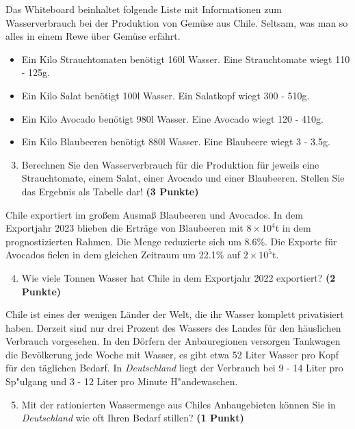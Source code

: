 \documentclass[a4paper, 9pt]{scrartcl}\usepackage[]{graphicx}\usepackage[]{xcolor}
\begin{document}
Das Whiteboard beinhaltet folgende Liste mit Informationen zum Wasserverbrauch bei der Produktion von Gemüse aus Chile. Seltsam, was man so alles in einem Rewe über Gemüse erfährt.
  
\begin{itemize}[noitemsep]
\item Ein Kilo Strauchtomaten benötigt 160l Wasser. Eine Strauchtomate wiegt 110 - 125g.
\item Ein Kilo Salat benötigt 100l Wasser. Ein Salatkopf wiegt 300 - 510g.
\item Ein Kilo Avocado benötigt 980l Wasser. Eine Avocado wiegt 120 - 410g.
\item Ein Kilo Blaubeeren benötigt 880l Wasser. Eine Blaubeere wiegt 3 - 3.5g.
\end{itemize}

\begin{enumerate}
  \setcounter{enumi}{2}
\item Berechnen Sie den Wasserverbrauch für die Produktion für jeweils eine Strauchtomate, einem Salat, einer Avocado und einer Blaubeeren. Stellen Sie das Ergebnis als Tabelle dar! \textbf{(3 Punkte)}
\end{enumerate}

Chile exportiert im großem Ausmaß Blaubeeren und Avocados. In dem Exportjahr 2023 blieben die Erträge von Blaubeeren mit \ensuremath{8\times 10^{4}}t in dem prognostizierten Rahmen. Die Menge reduzierte sich um 8.6\%. Die Exporte für Avocados fielen in dem gleichen Zeitraum um 22.1\% auf \ensuremath{2\times 10^{5}}t.

\begin{enumerate}
  \setcounter{enumi}{3}
\item Wie viele Tonnen Wasser hat Chile in dem Exportjahr 2022 exportiert? \textbf{(2 Punkte)}
\end{enumerate}

Chile ist eines der wenigen Länder der Welt, die ihr Wasser komplett privatisiert haben. Derzeit sind nur drei Prozent des Wassers des Landes für den häuslichen Verbrauch vorgesehen. In den Dörfern der Anbauregionen versorgen Tankwagen die Bevölkerung jede Woche mit Wasser, es gibt etwa 52 Liter Wasser pro Kopf für den täglichen Bedarf. In \textit{Deutschland} liegt der Verbrauch bei 9 - 14 Liter pro Sp{"u}lgang und 3 - 12 Liter pro Minute H{"a}ndewaschen.

\begin{enumerate}
  \setcounter{enumi}{4}
\item Mit der rationierten Wassermenge aus Chiles Anbaugebieten können Sie in \textit{Deutschland} wie oft Ihren Bedarf stillen? \textbf{(1 Punkt)}
\end{enumerate}
\end{document}
